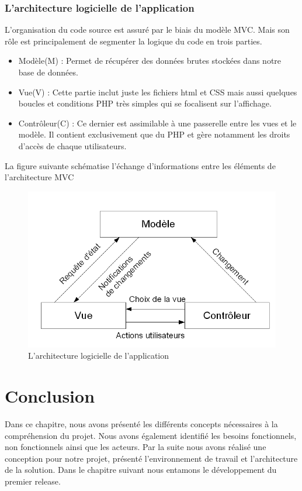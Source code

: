 \subsubsection{L'architecture  logicielle de l’application}
L’organisation du code source est assuré par le biais du modèle MVC. Mais son rôle est principalement de segmenter la logique du code en trois parties. 
\begin{itemize}
	\item Modèle(M) : Permet de récupérer des données brutes stockées dans notre base de données.
	\item Vue(V) : Cette partie inclut juste les fichiers html et CSS mais aussi quelques boucles et conditions PHP très simples qui se focalisent sur l’affichage. 
	\item Contrôleur(C) : Ce dernier est assimilable à une passerelle entre les vues et le modèle. Il contient exclusivement que du PHP et gère notamment les droits d’accès de chaque utilisateurs. 
\end{itemize}
La figure suivante schématise l’échange d’informations entre les éléments de l’architecture MVC
\begin{figure}[H]
	\centering
	\includegraphics[width=0.7\linewidth]{img/mvc}
	\caption[L'architecture logicielle de l’application]{L'architecture logicielle de l’application}
	\label{fig:mvc}
\end{figure}

\section{Conclusion}
Dans ce chapitre, nous avons présenté les différents concepts nécessaires à la compréhension du projet. Nous avons également identifié les besoins fonctionnels, non fonctionnels ainsi que les acteurs. Par la suite nous avons réalisé une conception pour notre projet, présenté l’environnement de travail et l’architecture de la solution. Dans le chapitre suivant nous entamons le développement du premier release.